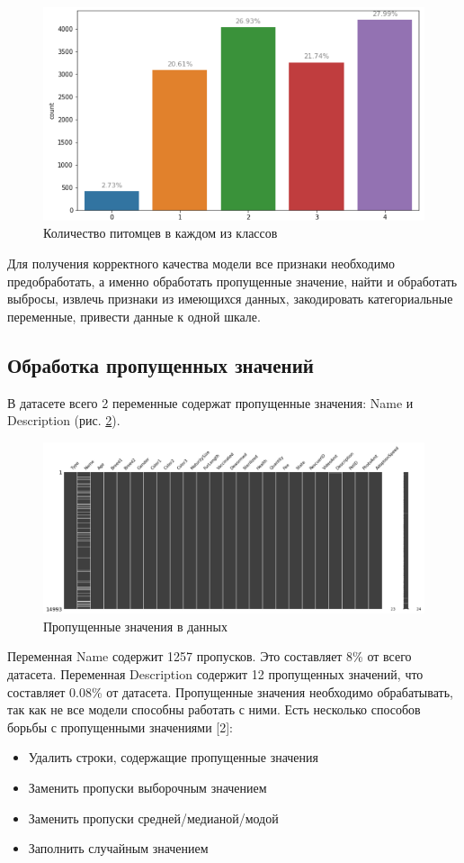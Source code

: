 \documentclass[14pt]{mmcs_article}
\begin{document}
\begin{figure}[H]
	\centering
	\includegraphics[scale=0.8]{speed.png}
	\caption{Количество питомцев в каждом из классов}\label{analyse:speed}
\end{figure}

Для получения корректного качества модели все признаки необходимо предобработать, а именно обработать пропущенные значение, найти и обработать выбросы, извлечь признаки из имеющихся данных, закодировать категориальные переменные, привести данные к одной шкале.

\subsection{Обработка пропущенных значений}

В датасете всего 2 переменные содержат пропущенные значения: Name и Description (рис. \ref{analyse:empty}). 

\begin{figure}[H]
	\centering
	\includegraphics[scale=0.5]{empty.png}
	\caption{Пропущенные значения в данных}\label{analyse:empty}
\end{figure}

Переменная Name содержит 1257 пропусков. Это составляет 8\% от всего датасета. Переменная Description содержит 12 пропущенных значений, что составляет 0.08\% от датасета.
Пропущенные значения необходимо обрабатывать, так как не все модели способны работать с ними. Есть несколько способов борьбы с пропущенными значениями [2]:
\begin{itemize}
	\item Удалить строки, содержащие пропущенные значения
	\item Заменить пропуски выборочным значением
	\item Заменить пропуски средней/медианой/модой
	\item Заполнить случайным значением
\end{itemize}
\end{document}
